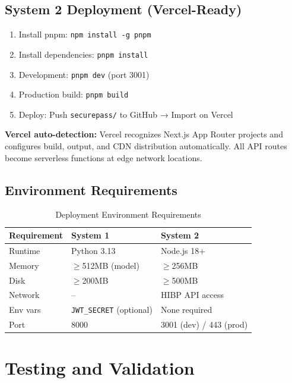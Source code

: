 \documentclass[12pt,a4paper]{article}
\begin{document}
\subsection{System 2 Deployment (Vercel-Ready)}

\begin{enumerate}
    \item Install pnpm: \texttt{npm install -g pnpm}
    \item Install dependencies: \texttt{pnpm install}
    \item Development: \texttt{pnpm dev} (port 3001)
    \item Production build: \texttt{pnpm build}
    \item Deploy: Push \texttt{securepass/} to GitHub → Import on Vercel
\end{enumerate}

\textbf{Vercel auto-detection:} Vercel recognizes Next.js App Router projects
and configures build, output, and CDN distribution automatically. All API
routes become serverless functions at edge network locations.

\subsection{Environment Requirements}

\begin{table}[H]
\centering
\begin{tabular}{lll}
\toprule
\textbf{Requirement} & \textbf{System 1} & \textbf{System 2} \\
\midrule
Runtime    & Python 3.13          & Node.js 18+ \\
Memory     & $\geq$512MB (model)  & $\geq$256MB \\
Disk       & $\geq$200MB          & $\geq$500MB \\
Network    & --                   & HIBP API access \\
Env vars   & \texttt{JWT\_SECRET} (optional) & None required \\
Port       & 8000                 & 3001 (dev) / 443 (prod) \\
\bottomrule
\end{tabular}
\caption{Deployment Environment Requirements}
\end{table}

\section{Testing and Validation}
\end{document}
